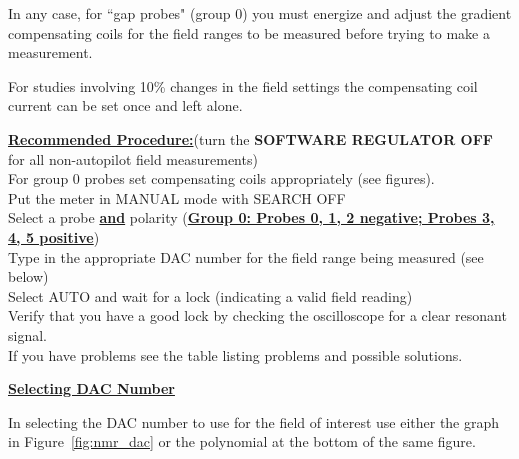 {In any case, for ``gap probes" (group 0) you must energize and adjust 
the gradient compensating coils for the field ranges to be measured before 
trying to make a measurement.

For studies involving 
10\% changes in the field settings the compensating coil current can be 
set once and left alone.


\noindent\underline{\bf Recommended Procedure:}(turn the {\bf SOFTWARE REGULATOR OFF} for all 
non-autopilot field measurements)\\
For group 0 probes set compensating coils appropriately (see figures).\\
Put the meter in MANUAL mode with SEARCH OFF \\
Select a probe \underline{\bf and} polarity (\underline{\bf Group 0:  
Probes 0, 1, 2 negative; Probes 3, 4, 5 positive}) \\
Type in the appropriate DAC number for the field range being measured (see below) \\
Select AUTO and wait for a lock (indicating a valid field reading) \\
Verify that you have a good lock by checking the oscilloscope for a 
clear resonant signal. \\
If you have problems see the table listing problems and possible 
solutions.

\noindent\underline{\bf Selecting DAC Number}

In selecting the DAC number to use for the field of interest use 
either the graph in Figure~\ref{fig:nmr_dac} or the polynomial at the bottom of the same figure.

}

